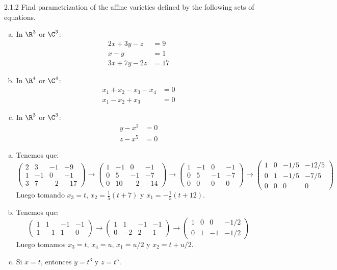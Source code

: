 \documentclass[twoside]{article}
\begin{document}
\begin{ejercicio}{2.1.2}
Find parametrization of the affine varieties defined by the following sets of equations.
\begin{enumerate}[a.]
\item In $\R^3$ or $\C^3$:
\begin{align*}
2x + 3y-z & = 9\\
x-y & = 1\\
3x + 7y - 2z & = 17
\end{align*}
\item In $\R^4$ or $\C^4$:
\begin{align*}
x_1 + x_2 - x_3 - x_4 & = 0\\
x_1 - x_2 + x_3 & = 0
\end{align*}
\item In $\R^3$ or $\C^3$:
\begin{align*}
y - x^3 & = 0\\
z - x^5 & = 0
\end{align*}
\end{enumerate}
\end{ejercicio}
\begin{solucion}
\begin{enumerate}[a.]
\item Tenemos que:
\[\begin{pmatrix}2 & 3 & -1 & -9\\1 & -1 & 0 & -1\\3 & 7 & -2 & -17\end{pmatrix} \to \begin{pmatrix}1 & -1 & 0 & -1\\0 & 5 & -1 & -7\\0 & 10 & -2 & -14\end{pmatrix} \to \begin{pmatrix}1 & -1 & 0 & -1\\0 & 5 & -1 & -7\\0 & 0 & 0 & 0\end{pmatrix} \to \begin{pmatrix}1 & 0 & -1/5 & -12/5\\0 & 1 & -1/5 & -7/5\\0 & 0 & 0 & 0\end{pmatrix}\]
Luego tomando $x_3 = t$, $x_2 = \frac{1}{5}(t+7)$ y $x_1 = -\frac{1}{5}(t+12)$.
\item Tenemos que:
\[\begin{pmatrix}1 & 1 & -1 & -1\\1 & -1 & 1 & 0\end{pmatrix} \to \begin{pmatrix}1 & 1 & -1 & -1\\0 & -2 & 2 & 1\end{pmatrix} \to \begin{pmatrix}1 & 0 & 0 & -1/2\\0 & 1 & -1 & -1/2\end{pmatrix}\]
Luego tomamos $x_3 = t$, $x_4 = u$, $x_1 = u/2$ y $x_2 = t+u/2$.
\item Si $x=t$, entonces $y=t^3$ y $z=t^5$.
\end{enumerate}
\end{solucion}
\end{document}
